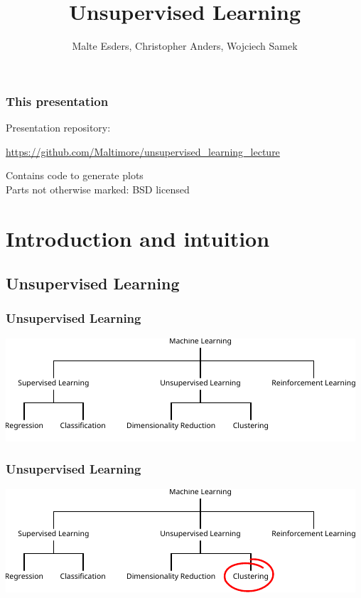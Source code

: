 \documentclass[Nike]{tuberlinbeamer}
\title{Unsupervised Learning}
\author{Malte Esders, Christopher Anders, Wojciech Samek}
\institute{Technische Universität Berlin - Machine Learning Group}
\begin{document}
\frame{\titlepage}


\begin{frame}
  \frametitle{This presentation}
  Presentation repository: \\
  \begin{center}
    \url{https://github.com/Maltimore/unsupervised_learning_lecture}\\
  \end{center}
  Contains code to generate plots\\
  Parts not otherwise marked: BSD licensed
\end{frame}


\section{Introduction and intuition}
\subsection{Unsupervised Learning}

\begin{frame}
 \frametitle{Unsupervised Learning}
  \begin{center}
    \vfill
    \includegraphics[width=\textwidth]{ml_schema}
    \vfill
  \end{center}
\end{frame}

\begin{frame}
 \frametitle{Unsupervised Learning}
  \begin{center}
    \vfill
    \includegraphics[width=\textwidth]{ml_schema_sel}
    \vfill
  \end{center}
\end{frame}
\end{document}
